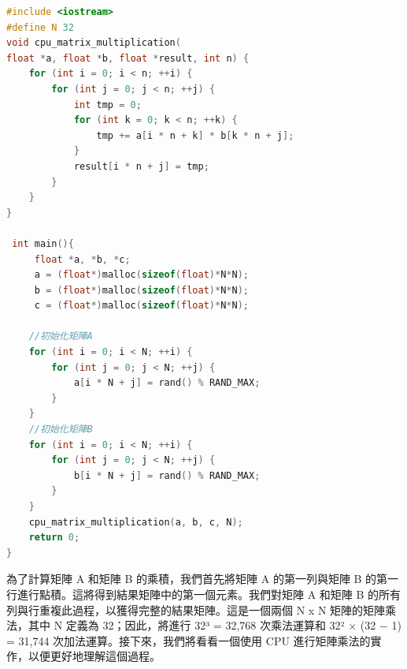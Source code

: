 \begin{lstlisting}[language=c++,caption={矩陣乘法的cpu實作}]
#include <iostream>
#define N 32
void cpu_matrix_multiplication(
float *a, float *b, float *result, int n) {
    for (int i = 0; i < n; ++i) {
        for (int j = 0; j < n; ++j) {
            int tmp = 0;
            for (int k = 0; k < n; ++k) {
                tmp += a[i * n + k] * b[k * n + j];
            }
            result[i * n + j] = tmp;
        }
    }
}

 int main(){
     float *a, *b, *c;
     a = (float*)malloc(sizeof(float)*N*N);
     b = (float*)malloc(sizeof(float)*N*N);
     c = (float*)malloc(sizeof(float)*N*N);
    
    //初始化矩陣A
    for (int i = 0; i < N; ++i) {
        for (int j = 0; j < N; ++j) {
            a[i * N + j] = rand() % RAND_MAX;
        }
    }
    //初始化矩陣B
    for (int i = 0; i < N; ++i) {
        for (int j = 0; j < N; ++j) {
            b[i * N + j] = rand() % RAND_MAX;
        }
    }
    cpu_matrix_multiplication(a, b, c, N);
    return 0;
}
\end{lstlisting}

\vspace{1em}
為了計算矩陣 A 和矩陣 B 的乘積，我們首先將矩陣 A 的第一列與矩陣 B 的第一行進行點積。這將得到結果矩陣中的第一個元素。我們對矩陣 A 和矩陣 B 的所有列與行重複此過程，以獲得完整的結果矩陣。這是一個兩個 N x N 矩陣的矩陣乘法，其中 N 定義為 32；因此，將進行 32³ = 32,768 次乘法運算和 32² × (32 − 1) = 31,744 次加法運算。接下來，我們將看看一個使用 CPU 進行矩陣乘法的實作，以便更好地理解這個過程。

\vspace{1em}

